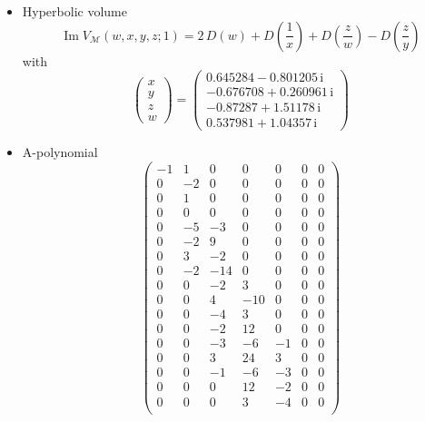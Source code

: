\documentclass[12pt,reqno]{amsart}
\numberwithin{equation}{section}
\renewcommand{\Im}{\operatorname{Im}}
\newcommand{\I}{\mathrm{i}}
\begin{document}
\begin{itemize}
\item Hyperbolic volume
  \begin{equation*}
    \Im V_{\mathcal{M}}(w,x,y,z; 1)
    =
    2 \, D \left( w\right)
    + D\left(\frac{1}{ x}\right)
    + D\left(\frac{z}{w}\right)
    - D\left(\frac{z}{y}\right)
  \end{equation*}
  with
  \begin{equation*}
    \begin{pmatrix}
      x \\ y \\ z \\ w
    \end{pmatrix}
    =
    \begin{pmatrix}
      0.645284 - 0.801205 \, \I
      \\
      -0.676708 +0.260961 \, \I
      \\
      -0.87287 + 1.51178 \, \I
      \\
       0.537981  + 1.04357  \, \I
    \end{pmatrix}
  \end{equation*}
\item A-polynomial
  \begin{equation*}
    \begin{pmatrix}
      -1 & 1 & 0 & 0 & 0 & 0 & 0 \\
      0 & -2 & 0 & 0 & 0 & 0 & 0 \\
      0 & 1 & 0 & 0 & 0 & 0 & 0 \\
      0 & 0 & 0 & 0 & 0 & 0 & 0 \\
      0 & -5 & -3 & 0 & 0 & 0 & 0 \\
      0 & -2 & 9 & 0 & 0 & 0 & 0 \\
      0 & 3 & -2 & 0 & 0 & 0 & 0 \\
      0 & -2 & -14 & 0 & 0 & 0 & 0 \\
      0 & 0 & -2 & 3 & 0 & 0 & 0 \\
      0 & 0 & 4 & -10 & 0 & 0 & 0 \\
      0 & 0 & -4 & 3 & 0 & 0 & 0 \\
      0 & 0 & -2 & 12 & 0 & 0 & 0 \\
      0 & 0 & -3 & -6 & -1 & 0 & 0 \\
      0 & 0 & 3 & 24 & 3 & 0 & 0 \\
      0 & 0 & -1 & -6 & -3 & 0 & 0 \\
      0 & 0 & 0 & 12 & -2 & 0 & 0 \\
      0 & 0 & 0 & 3 & -4 & 0 & 0 \\

\end{pmatrix}
\end{equation*}
\end{itemize}
\end{document}
